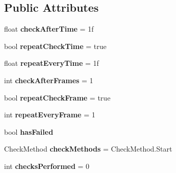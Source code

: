 \subsection*{Public Attributes}
\begin{DoxyCompactItemize}
\item 
\mbox{\label{class_unity_test_1_1_assertion_component_a7a0ead4fa2cd3d7fb6f6017cc7298d08}} 
float {\bfseries check\+After\+Time} = 1f
\item 
\mbox{\label{class_unity_test_1_1_assertion_component_a70066a56b0a70a54e186adff5040cdcd}} 
bool {\bfseries repeat\+Check\+Time} = true
\item 
\mbox{\label{class_unity_test_1_1_assertion_component_a0a78c16621e252cca300f4fb7888381f}} 
float {\bfseries repeat\+Every\+Time} = 1f
\item 
\mbox{\label{class_unity_test_1_1_assertion_component_a11bf6c1197d470a2e58e79b52589be59}} 
int {\bfseries check\+After\+Frames} = 1
\item 
\mbox{\label{class_unity_test_1_1_assertion_component_ad1e94ef86b5a1390550bd014f688d22f}} 
bool {\bfseries repeat\+Check\+Frame} = true
\item 
\mbox{\label{class_unity_test_1_1_assertion_component_a6491fb09d2e2c428f050b56f4b7152f4}} 
int {\bfseries repeat\+Every\+Frame} = 1
\item 
\mbox{\label{class_unity_test_1_1_assertion_component_a6779fd2db8d83464f7f07a79c9696d23}} 
bool {\bfseries has\+Failed}
\item 
\mbox{\label{class_unity_test_1_1_assertion_component_afa077898488f4742443337091d83eda2}} 
Check\+Method {\bfseries check\+Methods} = Check\+Method.\+Start
\item 
\mbox{\label{class_unity_test_1_1_assertion_component_acd706a84c6328b665aac6dfde7896199}} 
int {\bfseries checks\+Performed} = 0
\end{DoxyCompactItemize}
